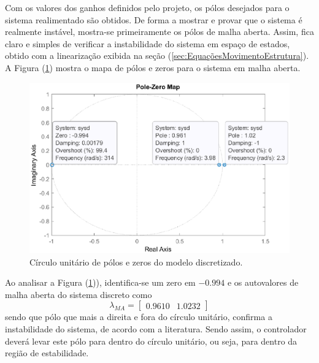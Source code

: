 Com os valores dos ganhos definidos pelo projeto, os pólos desejados para o sistema realimentado são obtidos. De forma a mostrar e provar que o sistema é realmente instável, mostra-se primeiramente os pólos de malha aberta. Assim, fica claro e simples de verificar a instabilidade do sistema em espaço de estados, obtido com a linearização exibida na seção (\ref{sec:EquaçõesMovimentoEstrutura}). A Figura (\ref{fig:Circulo-Unitario-Discreto}) mostra o mapa de pólos e zeros para o sistema em malha aberta.
\begin{figure}[H]
    \centering
    \includegraphics[scale=0.7]{ProjControladores/pzmap_discreto.eps}
    \caption{Círculo unitário de pólos e zeros do modelo discretizado.}
    \label{fig:Circulo-Unitario-Discreto}
\end{figure}{}

Ao analisar a Figura (\ref{fig:Circulo-Unitario-Discreto})), identifica-se um zero em $-0.994$ e os autovalores de malha aberta do sistema discreto como
\begin{equation*}
\lambda_{MA} = \begin{bmatrix}
        0.9610 & 1.0232
    \end{bmatrix}
\end{equation*}
sendo que pólo que mais a direita e fora do círculo unitário, confirma a instabilidade do sistema, de acordo com a literatura. Sendo assim, o controlador deverá levar este pólo para dentro do círculo unitário, ou seja, para dentro da região de estabilidade.


